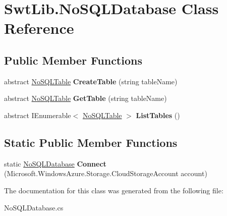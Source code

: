 \hypertarget{class_swt_lib_1_1_no_s_q_l_database}{\section{Swt\-Lib.\-No\-S\-Q\-L\-Database Class Reference}
\label{class_swt_lib_1_1_no_s_q_l_database}
}
\subsection*{Public Member Functions}
\begin{DoxyCompactItemize}
\item 
\hypertarget{class_swt_lib_1_1_no_s_q_l_database_a2da613fe1a8427bd2ffc02ebc01c0f60}{abstract \hyperlink{interface_swt_lib_1_1_no_s_q_l_table}{No\-S\-Q\-L\-Table} {\bfseries Create\-Table} (string table\-Name)}\label{class_swt_lib_1_1_no_s_q_l_database_a2da613fe1a8427bd2ffc02ebc01c0f60}

\item 
\hypertarget{class_swt_lib_1_1_no_s_q_l_database_acce068a352112abaa2aabe3da060b19a}{abstract \hyperlink{interface_swt_lib_1_1_no_s_q_l_table}{No\-S\-Q\-L\-Table} {\bfseries Get\-Table} (string table\-Name)}\label{class_swt_lib_1_1_no_s_q_l_database_acce068a352112abaa2aabe3da060b19a}

\item 
\hypertarget{class_swt_lib_1_1_no_s_q_l_database_ab2e777e1f340fb0babe63924cd398d41}{abstract I\-Enumerable$<$ \hyperlink{interface_swt_lib_1_1_no_s_q_l_table}{No\-S\-Q\-L\-Table} $>$ {\bfseries List\-Tables} ()}\label{class_swt_lib_1_1_no_s_q_l_database_ab2e777e1f340fb0babe63924cd398d41}

\end{DoxyCompactItemize}
\subsection*{Static Public Member Functions}
\begin{DoxyCompactItemize}
\item 
\hypertarget{class_swt_lib_1_1_no_s_q_l_database_ae0b7ce581c34a475062af6289293ce0e}{static \hyperlink{class_swt_lib_1_1_no_s_q_l_database}{No\-S\-Q\-L\-Database} {\bfseries Connect} (Microsoft.\-Windows\-Azure.\-Storage.\-Cloud\-Storage\-Account account)}\label{class_swt_lib_1_1_no_s_q_l_database_ae0b7ce581c34a475062af6289293ce0e}

\end{DoxyCompactItemize}


The documentation for this class was generated from the following file\-:\begin{DoxyCompactItemize}
\item 
No\-S\-Q\-L\-Database.\-cs\end{DoxyCompactItemize}
